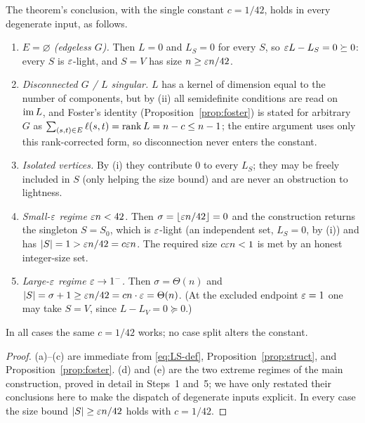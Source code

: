 \begin{qsixproposition}\label{prop:degenerate}
The theorem's conclusion, with the single constant $c=1/42$, holds in every
degenerate input, as follows.
\begin{enumerate}
\item[\textup{(a)}] \emph{$E=\varnothing$ \textup{(}edgeless $G$\textup{)}.} Then
$L=0$ and $L_S=0$ for every $S$, so $\varepsilon L-L_S=0\succeq0$: every $S$ is
$\varepsilon$-light, and $S=V$ has size $n\ge\varepsilon n/42$.
\item[\textup{(b)}] \emph{Disconnected $G$ / $L$ singular.} $L$ has a kernel of
dimension equal to the number of components, but by \textup{(ii)} all
semidefinite conditions are read on $\operatorname{im} L$, and Foster's identity
\textup{(Proposition~\ref{prop:foster})} is stated for arbitrary
$G$ as $\sum_{(s,t)\in E}\ell(s,t)=\operatorname{rank} L=n-c\le n-1$; the entire argument
uses only this rank-corrected form, so disconnection never enters the constant.
\item[\textup{(c)}] \emph{Isolated vertices.} By \textup{(i)} they contribute $0$
to every $L_S$; they may be freely included in $S$ (only helping the size bound)
and are never an obstruction to lightness.
\item[\textup{(d)}] \emph{Small-$\varepsilon$ regime $\varepsilon n<42$.} Then
$\sigma=\lfloor\varepsilon n/42\rfloor=0$ and the construction returns the singleton
$S=S_0$, which is $\varepsilon$-light \textup{(}an independent set, $L_S=0$, by
\textup{(i)}\textup{)} and has $|S|=1>\varepsilon n/42=c\varepsilon n$. The required
size $c\varepsilon n<1$ is met by an honest integer-size set.
\item[\textup{(e)}] \emph{Large-$\varepsilon$ regime $\varepsilon\to1^-$.} Then
$\sigma=\Theta(n)$ and $|S|=\sigma+1\ge\varepsilon n/42=cn\cdot\varepsilon=\Theta(n)$.
\textup{(}At the excluded endpoint $\varepsilon=1$ one may take $S=V$, since
$L-L_V=0\succeq0$.\textup{)}
\end{enumerate}
In all cases the same $c=1/42$ works; no case split alters the constant.
\end{qsixproposition}

\begin{proof}
(a)--(c) are immediate from \eqref{eq:LS-def}, Proposition~\ref{prop:struct}, and
Proposition~\ref{prop:foster}. (d) and (e) are the two extreme regimes of the
main construction, proved in detail in Steps~1 and~5; we have only restated their
conclusions here to make the dispatch of degenerate inputs explicit. In every
case the size bound $|S|\ge\varepsilon n/42$ holds with $c=1/42$.
\end{proof}

